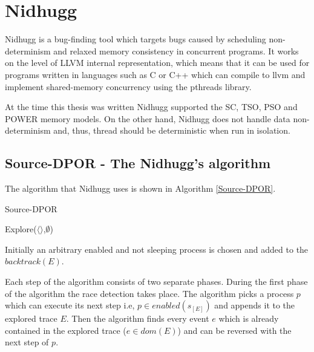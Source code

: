\chapter{Nidhugg}
\label{Chapter 3}

Nidhugg is a bug-finding tool which targets bugs caused by scheduling non-determinism
and relaxed memory consistency in concurrent programs. It works on the
level of LLVM internal representation, which means that it can be used
for programs written in languages such as C or C++ which can compile to llvm and implement shared-memory concurrency using the pthreads
library.

At the time this thesis was written Nidhugg supported the SC, TSO, PSO and POWER memory
models. On the other hand, Nidhugg does not handle data non-determinism and, thus,
thread should be deterministic when run in isolation.

\section{Source-DPOR - The Nidhugg's algorithm}

The algorithm that Nidhugg uses is shown in Algorithm \ref{Source-DPOR}.

\begin{algorithm}
    \label{Source-DPOR}
    \caption{Source-DPOR}
    Explore($\langle \rangle$,$\emptyset$)\;
\end{algorithm}

\noindent Initially an arbitrary enabled and not sleeping
process is chosen and added to the $backtrack(E)$. 

Each step of the algorithm consists of two separate phases. 
During the first phase of the algorithm the race detection takes place.
The algorithm picks a process $p$ which can execute its next step i.e, $p \in enabled(s_{[E]})$ and appends it to the explored trace $E$.
Then the algorithm finds every event $e$ which is already contained in the explored trace ($e \in dom(E)$) and can be reversed with the next step of $p$.

